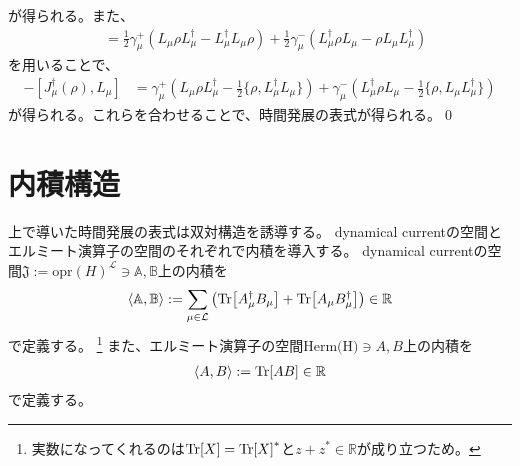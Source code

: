 \documentclass[a4paper,11pt]{jsarticle}
\numberwithin{equation}{section}
\begin{document}
が得られる。また、
\begin{align}
[J_{\mu}(\rho), L_{\mu}^{\dagger}]
&= \frac{1}{2} \gamma_{\mu}^{+} (L_{\mu} \rho L_{\mu}^{\dagger} - L_{\mu}^{\dagger} L_{\mu} \rho)
+ \frac{1}{2} \gamma_{\mu}^{-} (L_{\mu}^{\dagger} \rho L_{\mu} - \rho L_{\mu} L_{\mu}^{\dagger}) 
\end{align}
を用いることで、
\begin{align}
[J_{\mu}(\rho), L_{\mu}^{\dagger}] - [J_{\mu}^{\dagger}(\rho), L_{\mu}]
&= \gamma_{\mu}^{+} 
\left( L_{\mu} \rho L_{\mu}^{\dagger} - \frac{1}{2} \{ \rho, L_{\mu}^{\dagger} L_{\mu} \} \right)
+ \gamma_{\mu}^{-}
\left( L_{\mu}^{\dagger} \rho L_{\mu} - \frac{1}{2} \{ \rho, L_{\mu} L_{\mu}^{\dagger} \} \right)
\end{align}
が得られる。これらを合わせることで、時間発展の表式が得られる。\qed\\

\section{内積構造}
上で導いた時間発展の表式は双対構造を誘導する。
dynamical currentの空間とエルミート演算子の空間のそれぞれで内積を導入する。
dynamical currentの空間$\mathfrak{J}:= \text{opr}(H)^{\mathcal{L}} \ni \mathbb{A},\mathbb{B}$上の内積を
\begin{align}
    \ev{\mathbb{A} , \mathbb{B}} := \sum_{\mu \in \mathcal{L}} \qty(\Tr[ A_{\mu}^{\dagger} B_{\mu}] + \Tr[A_{\mu} B_{\mu}^{\dagger}]) \in \mathbb{R}
\end{align} 
で定義する。
\footnote{
    実数になってくれるのは$\Tr[X] = \Tr[X]^*$と$z+z^* \in \mathbb{R}$が成り立つため。
}
また、エルミート演算子の空間$\text{Herm(H)} \ni A,B$上の内積を
\begin{align}
    \ev{A, B} := \Tr[A B] \in \mathbb{R}
\end{align}
で定義する。
\end{document}
